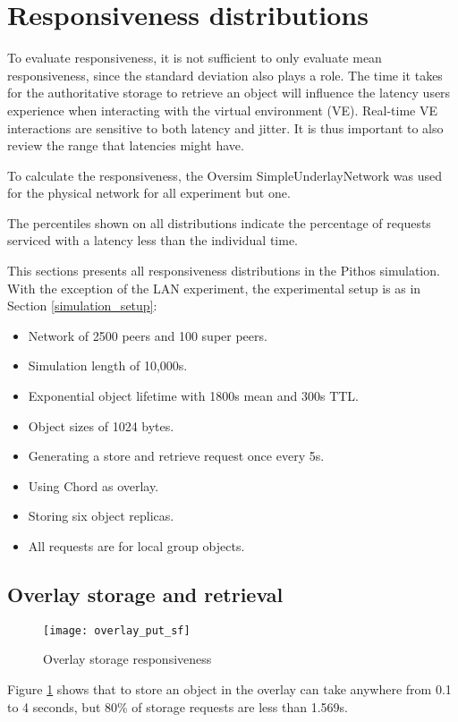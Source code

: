 \section{Responsiveness distributions}

To evaluate responsiveness, it is not sufficient to only evaluate mean responsiveness, since the standard deviation also plays a role. The time it takes for the authoritative storage to retrieve an object will influence the latency users experience when interacting with the virtual environment (VE). Real-time VE interactions are sensitive to both latency and jitter. It is thus important to also review the range that latencies might have.

To calculate the responsiveness, the Oversim SimpleUnderlayNetwork was used for the physical network for all experiment but one.

The percentiles shown on all distributions indicate the percentage of requests serviced with a latency less than the individual time.

This sections presents all responsiveness distributions in the Pithos simulation. With the exception of the LAN experiment, the experimental setup is as in Section \ref{simulation_setup}:
%
\begin{itemize}
\item Network of 2500 peers and 100 super peers.
\item Simulation length of 10,000s.
\item Exponential object lifetime with 1800s mean and 300s TTL.
\item Object sizes of 1024 bytes.
\item Generating a store and retrieve request once every 5s.
\item Using Chord as overlay.
\item Storing six object replicas.
\item All requests are for local group objects.
\end{itemize}

\subsection{Overlay storage and retrieval}

\begin{figure}[htbp]
 \centering
 \texttt{[image: overlay\_put\_sf]}
 \caption{Overlay storage responsiveness}
 \label{fig_overlay_put_sf}
\end{figure}
%
Figure \ref{fig_overlay_put_sf} shows that to store an object in the overlay can take anywhere from 0.1 to 4 seconds, but 80\% of storage requests are less than 1.569s.

